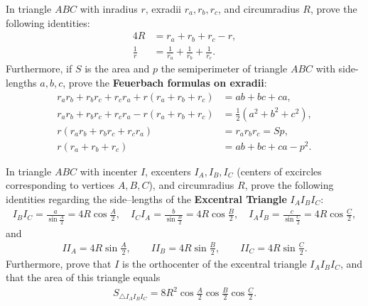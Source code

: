 \documentclass[12pt,a4paper]{memoir}
\theoremstyle{definition}
\begin{document}
\begin{question}[name=Feuerbach Formulas on Exradii]
	In triangle $ABC$ with inradius $r$, exradii $r_a,r_b,r_c$, and circumradius $R$, prove the following identities:
	\begin{align*}
		4R &= r_a + r_b + r_c - r,\\
		\frac{1}{r} &= \frac{1}{r_a} + \frac{1}{r_b} + \frac{1}{r_c}.
	\end{align*}
	Furthermore, if $S$ is the area and $p$ the semiperimeter of triangle $ABC$ with side-lengths $a,b,c$, prove the \textbf{Feuerbach formulas on exradii}:
	\begin{align*}
		r_ar_b+r_br_c+r_cr_a +r(r_a+r_b+r_c) &= ab+bc+ca,\\
		r_ar_b+r_br_c+r_cr_a -r(r_a+r_b+r_c) &= \frac{1}{2}\left(a^2+b^2+c^2\right),\\
		r(r_ar_b+r_br_c+r_cr_a) &= r_ar_br_c = Sp,\\
		r(r_a+r_b+r_c) &= ab+bc+ca - p^2.
	\end{align*}
\end{question}


\begin{question}[name={Excentral Triangle Side--Lengths}]
	In triangle $ABC$ with incenter $I$, excenters $I_A, I_B, I_C$ (centers of excircles corresponding to vertices $A,B,C$), and circumradius $R$, prove the following identities regarding the side--lengths of the \textbf{Excentral Triangle} $I_AI_BI_C$:
	\begin{align*}
		I_BI_C = \frac{a}{\displaystyle\sin\frac{A}{2}}=4R\cos\frac{A}{2}, \quad I_CI_A = \frac{b}{\displaystyle\sin\frac{B}{2}}=4R\cos\frac{B}{2}, \quad
		I_AI_B = \frac{c}{\displaystyle\sin\frac{C}{2}}=4R\cos\frac{C}{2},
	\end{align*}
	and
	\begin{align*}
		II_A = 4R\sin\frac{A}{2}, \qquad II_B = 4R\sin\frac{B}{2}, \qquad II_C = 4R\sin\frac{C}{2}.
	\end{align*}
	Furthermore, prove that $I$ is the orthocenter of the excentral triangle $I_AI_BI_C$, and that the area of this triangle equals
	\begin{align*}
		S_{\triangle I_AI_BI_C} = 8R^2\cos\frac{A}{2}\cos\frac{B}{2}\cos\frac{C}{2}.
	\end{align*}
\end{question}
\end{document}
